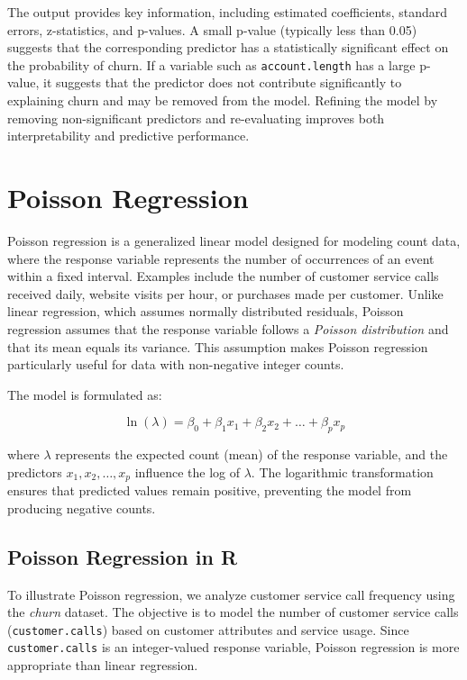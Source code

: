 \documentclass[
]{book}
\newcommand{\passthrough}[1]{#1}
\theoremstyle{definition}
\theoremstyle{definition}
\theoremstyle{definition}
\theoremstyle{definition}
\theoremstyle{remark}
\begin{document}
The output provides key information, including estimated coefficients, standard errors, z-statistics, and p-values. A small p-value (typically less than 0.05) suggests that the corresponding predictor has a statistically significant effect on the probability of churn. If a variable such as \passthrough{\lstinline!account.length!} has a large p-value, it suggests that the predictor does not contribute significantly to explaining churn and may be removed from the model. Refining the model by removing non-significant predictors and re-evaluating improves both interpretability and predictive performance.

\section{Poisson Regression}\label{poisson-regression}

Poisson regression is a generalized linear model designed for modeling count data, where the response variable represents the number of occurrences of an event within a fixed interval. Examples include the number of customer service calls received daily, website visits per hour, or purchases made per customer. Unlike linear regression, which assumes normally distributed residuals, Poisson regression assumes that the response variable follows a \emph{Poisson distribution} and that its mean equals its variance. This assumption makes Poisson regression particularly useful for data with non-negative integer counts.

The model is formulated as:

\[
\ln(\lambda) = \beta_0 + \beta_1 x_1 + \beta_2 x_2 + \dots + \beta_p x_p
\]

where \(\lambda\) represents the expected count (mean) of the response variable, and the predictors \(x_1, x_2, \dots, x_p\) influence the log of \(\lambda\). The logarithmic transformation ensures that predicted values remain positive, preventing the model from producing negative counts.

\subsection*{Poisson Regression in R}\label{poisson-regression-in-r}

To illustrate Poisson regression, we analyze customer service call frequency using the \emph{churn} dataset. The objective is to model the number of customer service calls (\passthrough{\lstinline!customer.calls!}) based on customer attributes and service usage. Since \passthrough{\lstinline!customer.calls!} is an integer-valued response variable, Poisson regression is more appropriate than linear regression.
\end{document}
